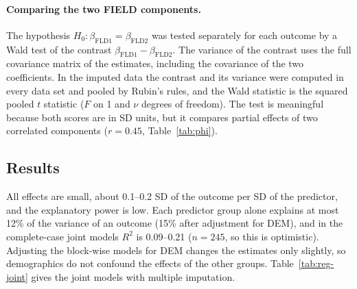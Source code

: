 \documentclass[11pt,a4paper]{article}
\begin{document}
\paragraph{Comparing the two FIELD components.}
The hypothesis $H_0\colon \beta_{\mathrm{FLD1}}=\beta_{\mathrm{FLD2}}$ was tested separately for each outcome by a Wald test of the contrast $\beta_{\mathrm{FLD1}}-\beta_{\mathrm{FLD2}}$. The variance of the contrast uses the full covariance matrix of the estimates, including the covariance of the two coefficients. In the imputed data the contrast and its variance were computed in every data set and pooled by Rubin's rules, and the Wald statistic is the squared pooled $t$ statistic ($F$ on 1 and $\nu$ degrees of freedom). The test is meaningful because both scores are in SD units, but it compares partial effects of two correlated components ($r=0.45$, Table~\ref{tab:phi}).

\subsection{Results}

All effects are small, about 0.1--0.2 SD of the outcome per SD of the predictor, and the explanatory power is low. Each predictor group alone explains at most 12\% of the variance of an outcome (15\% after adjustment for DEM), and in the complete-case joint models $R^2$ is 0.09--0.21 ($n=245$, so this is optimistic). Adjusting the block-wise models for DEM changes the estimates only slightly, so demographics do not confound the effects of the other groups. Table~\ref{tab:reg-joint} gives the joint models with multiple imputation.
\end{document}
